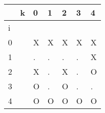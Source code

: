\documentclass{article}
\begin{document}
    \begin{center}

    \large
        \begin{tabular}{| m{.35cm} | m{.35cm} | m{.35cm} | m{.35cm} | m{.35cm} | m{.35cm} | m{.35cm} |}

            \hline
            & k & 0 & 1 & 2 & 3 & 4 \\
            \hline
            i & &  &  &  &  &  \\
            \hline
            0 & & X & X & X & X & X \\
            \hline
            1 & & . & . & . & . & X \\
            \hline
            2 & & X & . & X & . & O \\
            \hline
            3 & & O & . & O & . & . \\
            \hline
            4 & & O & O & O & O & O \\
            \hline
        
    \end{tabular}
    \end{center}
\end{document}
